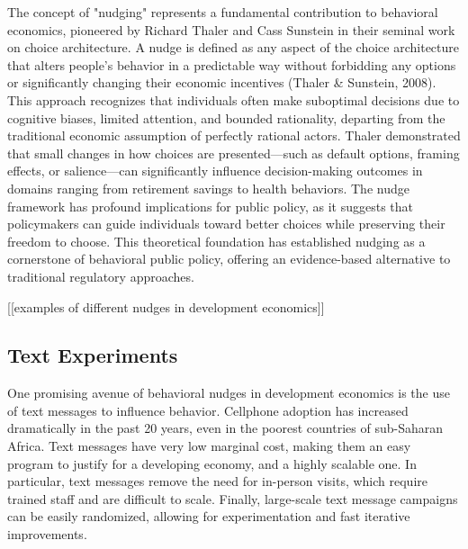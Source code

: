 \documentclass[12pt]{article}
\begin{document}
The concept of "nudging" represents a fundamental contribution to behavioral economics, pioneered by Richard Thaler and Cass Sunstein in their seminal work on choice architecture. A nudge is defined as any aspect of the choice architecture that alters people's behavior in a predictable way without forbidding any options or significantly changing their economic incentives (Thaler \& Sunstein, 2008). This approach recognizes that individuals often make suboptimal decisions due to cognitive biases, limited attention, and bounded rationality, departing from the traditional economic assumption of perfectly rational actors. Thaler demonstrated that small changes in how choices are presented—such as default options, framing effects, or salience—can significantly influence decision-making outcomes in domains ranging from retirement savings to health behaviors. The nudge framework has profound implications for public policy, as it suggests that policymakers can guide individuals toward better choices while preserving their freedom to choose. This theoretical foundation has established nudging as a cornerstone of behavioral public policy, offering an evidence-based alternative to traditional regulatory approaches.

[[examples of different nudges in development economics]]

\subsection{Text Experiments}
One promising avenue of behavioral nudges in development economics is the use of text messages to influence behavior. Cellphone adoption has increased dramatically in the past 20 years, even in the poorest countries of sub-Saharan Africa. Text messages have very low marginal cost, making them an easy program to justify for a developing economy, and a highly scalable one. In particular, text messages remove the need for in-person visits, which require trained staff and are difficult to scale. Finally, large-scale text message campaigns can be easily randomized, allowing for experimentation and fast iterative improvements.
\end{document}
